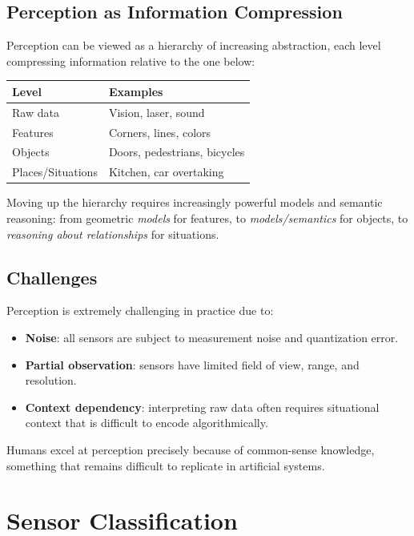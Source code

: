\documentclass[11pt,a4paper]{article}
\theoremstyle{definition}
\theoremstyle{plain}
\theoremstyle{remark}
\begin{document}
\subsection{Perception as Information Compression}

Perception can be viewed as a hierarchy of increasing abstraction, each level compressing information relative to the one below:

\begin{center}
\begin{tabular}{ll}
\hline
\textbf{Level} & \textbf{Examples} \\
\hline
Raw data & Vision, laser, sound \\
Features & Corners, lines, colors \\
Objects & Doors, pedestrians, bicycles \\
Places/Situations & Kitchen, car overtaking \\
\hline
\end{tabular}
\end{center}

Moving up the hierarchy requires increasingly powerful models and semantic reasoning: from geometric \textit{models} for features, to \textit{models/semantics} for objects, to \textit{reasoning about relationships} for situations.

\subsection{Challenges}

Perception is extremely challenging in practice due to:
\begin{itemize}
    \item \textbf{Noise}: all sensors are subject to measurement noise and quantization error.
    \item \textbf{Partial observation}: sensors have limited field of view, range, and resolution.
    \item \textbf{Context dependency}: interpreting raw data often requires situational context that is difficult to encode algorithmically.
\end{itemize}

Humans excel at perception precisely because of common-sense knowledge, something that remains difficult to replicate in artificial systems.

\section{Sensor Classification}
\end{document}
